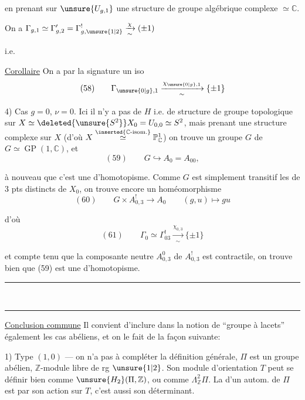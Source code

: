 en prenant sur $\unsure{U_{g,1}}$ une structure de groupe algébrique complexe $\simeq\mathbb{C}$.

On a  $\Gamma_{g,1}\simeq\Gamma'_{g,2}=\Gamma^!_{g,\unsure{1|2}}\xrightarrow[\sim]{\chi}(\pm1)$

i.e.

\uline{Corollaire} On a par la signature un iso
\[
(58)\qquad\Gamma_{\unsure{0|g},1}\xrightarrow[\sim]{\chi_{\unsure{0|g},1}}\{\pm1\}
\]

4) Cas $g=0$, $\nu=0$. Ici il n'y a pas de $H$ i.e. de structure de groupe topologique sur $X\simeq\deleted{\unsure{S^2}}X_0=U_{0,0}\simeq S^2$, mais prenant une structure complexe sur $X$ (d'où $X\overset{\inserted{\mathbb{C}\text{-isom.}}}{\simeq}\mathbb{P}^1_{\mathbb{C}}$) on trouve un groupe $G$ de   $G\simeq\operatorname{GP}(1,\mathbb{C})$, et
\[
(59)\qquad G\hookrightarrow A_0=A_{00},
\]

 à nouveau que c'est une  d'homotopisme. Comme $G$ est simplement transitif  les   de $3$ pts distincts de $X_0$, on trouve encore un homéomorphisme
\[
(60)\qquad G\times A^!_{0,3}\longrightarrow A_0\qquad(g,u)\longmapsto gu
\]

d'où
\[
(61)\qquad\Gamma_0\simeq\Gamma^!_{03}\xrightarrow[\sim]{\chi_{0,3}}\{\pm1\}
\]

et compte tenu que la composante neutre $A^0_{0,3}$ de $A^!_{0,3}$ est contractile, on trouve bien  que (59) est une  d'homotopisme.
\begin{center}\rule{1.2cm}{0.25pt}\\[-0.8em]\rule{1.2cm}{0.25pt}\end{center}

\uline{Conclusion commune}  Il convient d'inclure dans la notion de ``groupe à lacets'' également les  cas abéliens, et on le fait de la façon suivante:

1) Type $(1,0)$ --- on n'a pas à compléter la définition générale,  $\Pi$ est un groupe abélien, $\mathbb{Z}$-module libre de rg $\unsure{1|2}$. Son module d'orientation $T$ peut se définir bien comme $\unsure{H_2}(\Pi,\mathbb{Z})$, ou comme $\Lambda^2_{\mathbb{Z}}\Pi$. La   d'un autom. de $\Pi$ est  par son action sur $T$, c'est aussi son déterminant.

